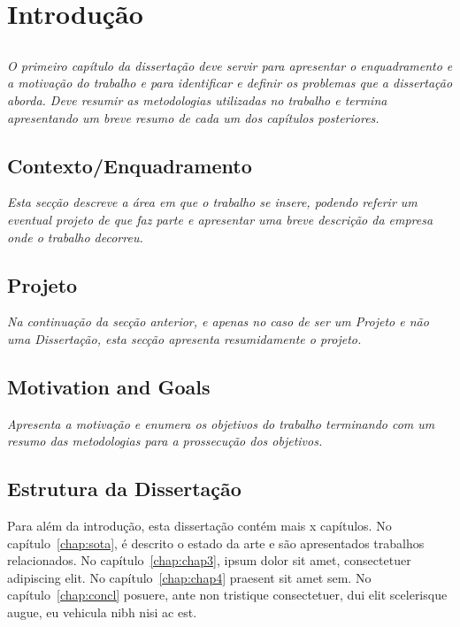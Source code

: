 
\chapter{Introdução} \label{chap:intro}

\section*{}

\textit{O primeiro capítulo da dissertação deve servir para apresentar o
enquadramento e a moti\-va\-ção do trabalho e para identificar e
definir os problemas que a dissertação aborda.
Deve resumir as metodologias utilizadas no trabalho e termina
apresentando um breve resumo de cada um dos capítulos
posteriores.}

\section{Contexto/Enquadramento} \label{sec:context}
\textit{
Esta secção descreve a área em que o trabalho se insere, podendo
referir um eventual projeto de que faz parte e apresentar uma breve
descrição da empresa onde o trabalho decorreu.
}



\section{Projeto} \label{sec:proj}

\textit{
Na continuação da secção anterior, e apenas no caso de ser um Projeto
e não uma Dissertação, esta secção apresenta resumidamente o projeto.
}


\section{Motivation and Goals} \label{sec:goals}

\textit{
Apresenta a motivação e enumera os objetivos do trabalho terminando
com um resumo das metodologias para a prossecução dos objetivos.
}

\section{Estrutura da Dissertação} \label{sec:struct}

Para além da introdução, esta dissertação contém mais x capítulos.
No capítulo~\ref{chap:sota}, é descrito o estado da arte e são
apresentados trabalhos relacionados. 
No capítulo~\ref{chap:chap3}, ipsum dolor sit amet, consectetuer
adipiscing elit.
No capítulo~\ref{chap:chap4} praesent sit amet sem. 
No capítulo~\ref{chap:concl}  posuere, ante non tristique
consectetuer, dui elit scelerisque augue, eu vehicula nibh nisi ac
est. 
